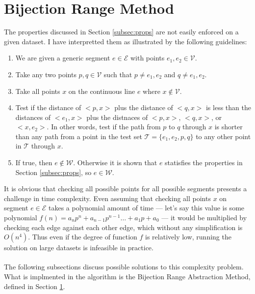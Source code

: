 \documentclass[12pt]{article}
\begin{document}
\section{Bijection Range Method}\label{subsec:bijection-range-method}
The properties discussed in Section \ref{subsec:props} are not easily enforced
on a given dataset. I have interpretted them as illustrated by the following guidelines:
\begin{enumerate}
\item We are given a generic segment $e \in \mathcal{E}$ with points
$e_1,e_2 \in \mathcal{V}$.
\item Take any two points $p,q \in \mathcal{V}$ such that $p \neq e_1,e_2$
and $q \neq e_1,e_2$.
\item Take all points $x$ on the continuous line $e$ where
$x \notin \mathcal{V}$.
\item Test if the distance of $<p,x>$ plus the distance of $<q,x>$
is less than the distances of $<e_1,x>$ plus the distnaces of
$<p,x>$, $<q,x>$, or $<x,e_2>$. In other words,
test if the path from $p$ to $q$ through $x$
is shorter than any path from a point in the test set $\mathcal{T} = \{e_1, e_2, p, q\}$
to any other point in $\mathcal{T}$ through $x$.
\item If true, then $e \notin \mathcal{W}$.
Otherwise it is shown that $e$ statisfies the
properties in Section \ref{subsec:props}, so $e \in \mathcal{W}$.
\end{enumerate}
It is obvious that checking all possible points for all possible segments presents
a challenge in time complexity. Even assuming that checking all points $x$ on segment
$e \in \mathcal{E}$ takes a polynomial amount of time --- let's say this value is some
polynomial $f(n) = a_np^n + a_{n - 1}p^{n - 1} \dots + a_1p + a_0$ ---
it would be multiplied by checking each edge against each other edge, which
without any simplification is $O(n^4)$. Thus even if the degree of function $f$ is
relatively low, running the solution on large datasets is infeasible in practice.
\\\\
The following subsections discuss possible solutions to this complexity
problem. What is implmented in the algorithm is the Bijection Range Abstraction Method,
defined in Section \ref{subsec:bijection-range-method}.
\end{document}
